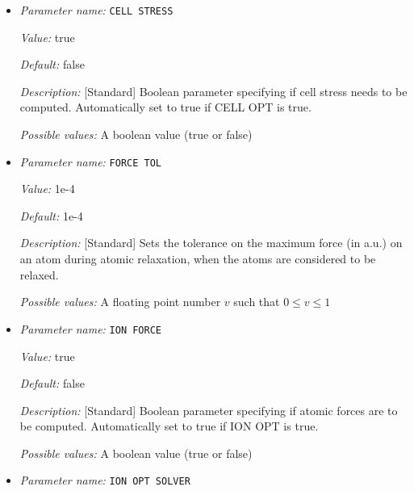 \begin{itemize}
{\it Default:} LBFGS


{\it Description:} [Standard] Method for Cell relaxation solver. LBFGS is the default


{\it Possible values:} Any one of BFGS, LBFGS, CGPRP
\item {\it Parameter name:} {\tt CELL STRESS}
\label{parameters:Geometry/Optimization/CELL STRESS}
\label{parameters:Geometry/Optimization/CELL_20STRESS}


{\it Value:} true


{\it Default:} false


{\it Description:} [Standard] Boolean parameter specifying if cell stress needs to be computed. Automatically set to true if CELL OPT is true.


{\it Possible values:} A boolean value (true or false)
\item {\it Parameter name:} {\tt FORCE TOL}
\label{parameters:Geometry/Optimization/FORCE TOL}
\label{parameters:Geometry/Optimization/FORCE_20TOL}


{\it Value:} 1e-4


{\it Default:} 1e-4


{\it Description:} [Standard] Sets the tolerance on the maximum force (in a.u.) on an atom during atomic relaxation, when the atoms are considered to be relaxed.


{\it Possible values:} A floating point number $v$ such that $0 \leq v \leq 1$
\item {\it Parameter name:} {\tt ION FORCE}
\label{parameters:Geometry/Optimization/ION FORCE}
\label{parameters:Geometry/Optimization/ION_20FORCE}


{\it Value:} true


{\it Default:} false


{\it Description:} [Standard] Boolean parameter specifying if atomic forces are to be computed. Automatically set to true if ION OPT is true.


{\it Possible values:} A boolean value (true or false)
\item {\it Parameter name:} {\tt ION OPT SOLVER}
\label{parameters:Geometry/Optimization/ION OPT SOLVER}
\label{parameters:Geometry/Optimization/ION_20OPT_20SOLVER}



\end{itemize}
